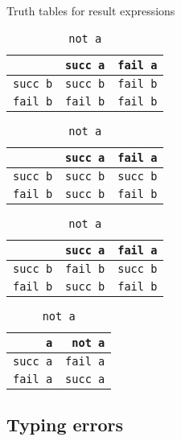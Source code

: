 \begin{table}[!h]
\caption{Truth tables for result expressions}

\begin{subtable}{.5\linewidth}
  \centering
  \caption{\lstinline$a and b$}
  \begin{tabular}{r|rr}
      & \lstinline$succ a$ & \lstinline$fail a$ \\
    \hline
    \lstinline$succ b$ & \lstinline$succ b$ & \lstinline$fail b$ \\
    \lstinline$fail b$ & \lstinline$fail b$ & \lstinline$fail b$
  \end{tabular}
\end{subtable}%
\begin{subtable}{.5\linewidth}
  \centering
  \caption{\lstinline$a or b$}
  \begin{tabular}{r|rr}
      & \lstinline$succ a$ & \lstinline$fail a$ \\
    \hline
    \lstinline$succ b$ & \lstinline$succ b$ & \lstinline$succ b$ \\
    \lstinline$fail b$ & \lstinline$succ b$ & \lstinline$fail b$
  \end{tabular}
\end{subtable}

\begin{subtable}{.5\linewidth}
  \centering
  \caption{\lstinline$a xor b$}
  \begin{tabular}{r|rr}
      & \lstinline$succ a$ & \lstinline$fail a$ \\
    \hline
    \lstinline$succ b$ & \lstinline$fail b$ & \lstinline$succ b$ \\
    \lstinline$fail b$ & \lstinline$succ b$ & \lstinline$fail b$
  \end{tabular}
\end{subtable}%
\begin{subtable}{.5\linewidth}
  \centering
  \caption{\lstinline$not a$}
  \begin{tabular}{r|r}
    \lstinline$a$ & \lstinline$not a$ \\
    \hline
    \lstinline$succ a$ & \lstinline$fail a$ \\
    \lstinline$fail a$ & \lstinline$succ a$
  \end{tabular}
\end{subtable}
\end{table}

\clearpage

\subsection{Typing errors}

